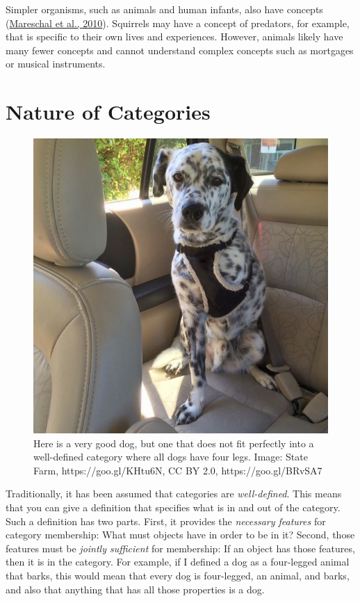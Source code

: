 \documentclass[
]{krantz}
\begin{document}
Simpler organisms, such as animals and human infants, also have concepts (\protect\hyperlink{ref-Mareschal2010}{Mareschal et al., 2010}). Squirrels may have a concept of predators, for example, that is specific to their own lives and experiences. However, animals likely have many fewer concepts and cannot understand complex concepts such as mortgages or musical instruments.

\hypertarget{nature-of-categories}{%
\section{Nature of Categories}\label{nature-of-categories}}

\begin{figure}

{\centering \includegraphics[width=0.5\linewidth]{images/ch7/dog} 

}

\caption{Here is a very good dog, but one that does not fit perfectly into a well-defined category where all dogs have four legs. Image: State Farm, https://goo.gl/KHtu6N, CC BY 2.0, https://goo.gl/BRvSA7 }\label{fig:dog}
\end{figure}

Traditionally, it has been assumed that categories are \emph{well-defined}. This means that you can give a definition that specifies what is in and out of the category. Such a definition has two parts. First, it provides the \emph{necessary features} for category membership: What must objects have in order to be in it? Second, those features must be \emph{jointly sufficient} for membership: If an object has those features, then it is in the category. For example, if I defined a dog as a four-legged animal that barks, this would mean that every dog is four-legged, an animal, and barks, and also that anything that has all those properties is a dog.
\end{document}
